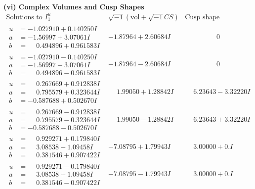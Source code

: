 \documentclass[1p]{elsarticle_modified}
\theoremstyle{definition}
\newcommand{\I}{\sqrt{-1}}
\begin{document}
\newpage\flushleft \textbf{(vi) Complex Volumes and Cusp Shapes}
$$\begin{array}{c|c|c}  
\text{Solutions to }I^u_{1}& \I (\text{vol} + \sqrt{-1}CS) & \text{Cusp shape}\\
 \hline 
\begin{aligned}
u &= -1.027910 + 0.140250 I \\
a &= -1.56997 + 3.07061 I \\
b &= \phantom{-}0.494896 + 0.961583 I\end{aligned}
 & -1.87964 + 2.60684 I & \phantom{-0.000000 } 0 \\ \hline\begin{aligned}
u &= -1.027910 - 0.140250 I \\
a &= -1.56997 - 3.07061 I \\
b &= \phantom{-}0.494896 - 0.961583 I\end{aligned}
 & -1.87964 - 2.60684 I & \phantom{-0.000000 } 0 \\ \hline\begin{aligned}
u &= \phantom{-}0.267669 + 0.912838 I \\
a &= \phantom{-}0.795579 + 0.323644 I \\
b &= -0.587688 + 0.502670 I\end{aligned}
 & \phantom{-}1.99050 + 1.28842 I & \phantom{-}6.23643 - 3.32220 I \\ \hline\begin{aligned}
u &= \phantom{-}0.267669 - 0.912838 I \\
a &= \phantom{-}0.795579 - 0.323644 I \\
b &= -0.587688 - 0.502670 I\end{aligned}
 & \phantom{-}1.99050 - 1.28842 I & \phantom{-}6.23643 + 3.32220 I \\ \hline\begin{aligned}
u &= \phantom{-}0.929271 + 0.179840 I \\
a &= \phantom{-}3.08538 - 1.09458 I \\
b &= \phantom{-}0.381546 + 0.907422 I\end{aligned}
 & -7.08795 + 1.79943 I & \phantom{-}3.00000 + 0. I\phantom{ +0.000000I} \\ \hline\begin{aligned}
u &= \phantom{-}0.929271 - 0.179840 I \\
a &= \phantom{-}3.08538 + 1.09458 I \\
b &= \phantom{-}0.381546 - 0.907422 I\end{aligned}
 & -7.08795 - 1.79943 I & \phantom{-}3.00000 + 0. I\phantom{ +0.000000I} \\ \hline\begin{aligned}

\end{aligned}
\end{array}$$
\end{document}
